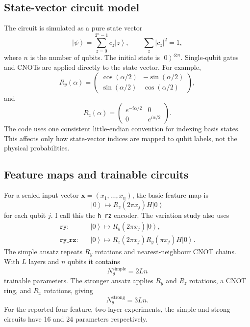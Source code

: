 \documentclass[10pt,a4paper]{article}
\newcommand{\ket}[1]{\left|#1\right\rangle}
\newcommand{\bx}{\bm{x}}
\newcommand{\code}[1]{\texttt{#1}}
\begin{document}
\subsection{State-vector circuit model}
The circuit is simulated as a pure state vector
\begin{equation}
  \ket{\psi}=\sum_{z=0}^{2^n-1} c_z\ket{z}, \qquad \sum_z |c_z|^2=1,
\end{equation}
where \(n\) is the number of qubits. The initial state is \(\ket{0}^{\otimes n}\). Single-qubit gates and CNOTs are applied directly to the state vector. For example,
\begin{equation}
R_y(\alpha)=
\begin{pmatrix}
\cos(\alpha/2) & -\sin(\alpha/2)\\
\sin(\alpha/2) & \cos(\alpha/2)
\end{pmatrix},
\end{equation}
and
\begin{equation}
R_z(\alpha)=
\begin{pmatrix}
e^{-i\alpha/2} & 0\\
0 & e^{i\alpha/2}
\end{pmatrix}.
\end{equation}
The code uses one consistent little-endian convention for indexing basis states. This affects only how state-vector indices are mapped to qubit labels, not the physical probabilities.

\subsection{Feature maps and trainable circuits}
For a scaled input vector \(\bx=(x_1,\ldots,x_n)\), the basic feature map is
\begin{equation}
  \ket{0}\mapsto R_z(2\pi x_j)H\ket{0}
\end{equation}
for each qubit \(j\). I call this the \code{h\_rz} encoder. The variation study also uses
\begin{align}
  \code{ry}:        &\quad \ket{0}\mapsto R_y(2\pi x_j)\ket{0},\\
  \code{ry\_rz}:   &\quad \ket{0}\mapsto R_z(2\pi x_j)R_y(\pi x_j)H\ket{0}.
\end{align}
The simple ansatz repeats \(R_y\) rotations and nearest-neighbour CNOT chains. With \(L\) layers and \(n\) qubits it contains
\begin{equation}
  N_\theta^{\mathrm{simple}}=2Ln
\end{equation}
trainable parameters. The stronger ansatz applies \(R_y\) and \(R_z\) rotations, a CNOT ring, and \(R_x\) rotations, giving
\begin{equation}
  N_\theta^{\mathrm{strong}}=3Ln.
\end{equation}
For the reported four-feature, two-layer experiments, the simple and strong circuits have 16 and 24 parameters respectively.
\end{document}

